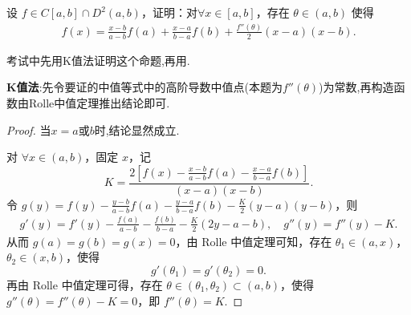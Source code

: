 \documentclass[../../main.tex]{subfiles}%
\begin{document}
\begin{proposition}[Lagrange插值公式]\label{proposition:Lagrange插值公式}
设 $f \in C[a, b] \cap D^2(a, b)$，证明：对$\forall x \in [a, b]$，存在 $\theta \in (a, b)$ 使得
\begin{align*}
f(x) = \frac{x - b}{a - b} f(a) + \frac{x - a}{b - a} f(b) + \frac{f''(\theta)}{2} (x - a)(x - b).
\end{align*}
\end{proposition}
\begin{remark}
考试中先用K值法证明这个命题,再用.
\end{remark}
\begin{note}
\textbf{K值法}:先令要证的中值等式中的高阶导数中值点(本题为$f''(\theta)$)为常数,再构造函数由Rolle中值定理推出结论即可.
\end{note}
\begin{proof}

当$x=a$或$b$时,结论显然成立.

对 $\forall x\in (a,b)$，固定 $x$，记
\[
K=\frac{2\left[ f(x) -\frac{x-b}{a-b}f(a) -\frac{x-a}{b-a}f(b) \right]}{\left( x-a \right) \left( x-b \right)}.
\]
令 $g(y) =f(y) -\frac{y-b}{a-b}f(a) -\frac{y-a}{b-a}f(b) -\frac{K}{2}\left( y-a \right) \left( y-b \right)$，则
\begin{align*}
g'(y) = f'(y) -\frac{f(a)}{a-b}-\frac{f(b)}{b-a}-\frac{K}{2}\left( 2y-a-b \right),\quad 
g''(y) = f''(y) -K.
\end{align*}
从而 $g(a) = g(b) = g(x) = 0$，由 Rolle 中值定理可知，存在 $\theta_1 \in (a,x)$，$\theta_2 \in (x,b)$，使得
\[
g'(\theta_1) = g'(\theta_2) = 0.
\]
再由 Rolle 中值定理可得，存在 $\theta \in (\theta_1, \theta_2) \subset (a,b)$，使得 $g''(\theta) = f''(\theta) - K = 0$，即 $f''(\theta) = K$.

\end{proof}
\end{document}
